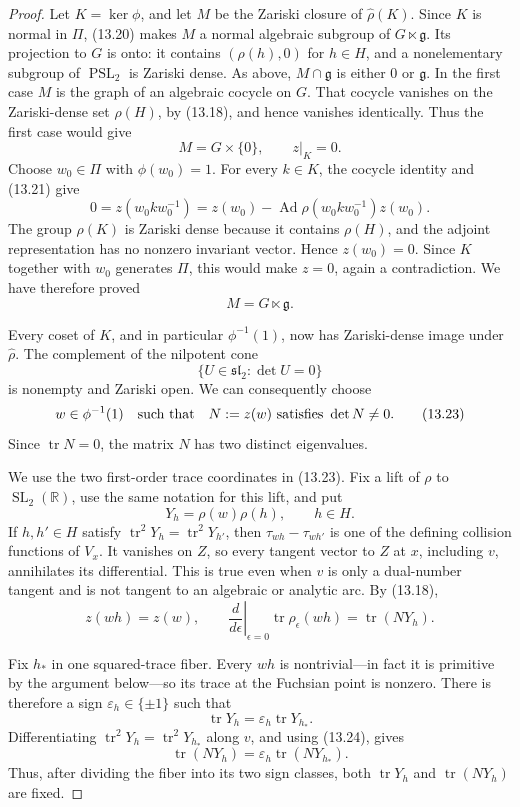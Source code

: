 \documentclass[11pt,reqno]{amsart}
\theoremstyle{definition}
\theoremstyle{remark}
\newcommand{\R}{\mathbb R}
\newcommand{\Tr}{\operatorname{tr}}
\newcommand{\SL}{\operatorname{SL}}
\newcommand{\PSL}{\operatorname{PSL}}
\newcommand{\Ad}{\operatorname{Ad}}
\begin{document}
\begin{proof}
Let \(K=\ker\phi\), and let \(M\) be the Zariski closure of
\(\widehat\rho(K)\).  Since \(K\) is normal in \(\Pi\), (13.20) makes
\(M\) a normal algebraic subgroup of \(G\ltimes\mathfrak g\).  Its
projection to \(G\) is onto: it contains
\((\rho(h),0)\) for \(h\in H\), and a nonelementary subgroup of
\(\PSL_2\) is Zariski dense.  As above,
\(M\cap\mathfrak g\) is either \(0\) or \(\mathfrak g\).  In the first
case \(M\) is the graph of an algebraic cocycle on \(G\).  That cocycle
vanishes on the Zariski-dense set \(\rho(H)\), by (13.18), and hence
vanishes identically.  Thus the first case would give
\[
 M=G\times\{0\},\qquad z|_K=0.
\tag{13.21}
\]
Choose \(w_0\in\Pi\) with \(\phi(w_0)=1\).  For every \(k\in K\), the
cocycle identity and (13.21) give
\[
 0=z(w_0kw_0^{-1})
   =z(w_0)-\Ad\rho(w_0kw_0^{-1})z(w_0).
\]
The group \(\rho(K)\) is Zariski dense because it contains \(\rho(H)\),
and the adjoint representation has no nonzero invariant vector.  Hence
\(z(w_0)=0\).  Since \(K\) together with \(w_0\) generates \(\Pi\), this
would make \(z=0\), again a contradiction.  We have therefore proved
\[
 M=G\ltimes\mathfrak g.
\tag{13.22}
\]

Every coset of \(K\), and in particular \(\phi^{-1}(1)\), now has
Zariski-dense image under \(\widehat\rho\).  The complement of the
nilpotent cone
\[
 \{U\in\mathfrak{sl}_2:\det U=0\}
\]
is nonempty and Zariski open.  We can consequently choose
\[
 w\in\phi^{-1}(1)
 \quad\hbox{such that}\quad
 N:=z(w)\ \hbox{satisfies}\ \det N\ne0.
\tag{13.23}
\]
Since \(\Tr N=0\), the matrix \(N\) has two distinct eigenvalues.

We use the two first-order trace coordinates in (13.23).  Fix a
lift of \(\rho\) to \(\SL_2(\R)\), use the same notation for this lift,
and put
\[
 Y_h=\rho(w)\rho(h),\qquad h\in H.
\]
If \(h,h'\in H\) satisfy
\(\Tr^2Y_h=\Tr^2Y_{h'}\), then
\(\tau_{wh}-\tau_{wh'}\) is one of the defining collision functions of
\(V_x\).  It vanishes on \(Z\), so every tangent vector to \(Z\) at \(x\),
including \(v\), annihilates its differential.  This is true even when
\(v\) is only a dual-number tangent and is not tangent to an algebraic or
analytic arc.  By (13.18),
\[
 z(wh)=z(w),
 \qquad
 \left.\frac{d}{d\epsilon}\right|_{\epsilon=0}
 \Tr\rho_\epsilon(wh)=\Tr(NY_h).
\tag{13.24}
\]

Fix \(h_*\) in one squared-trace fiber.  Every \(wh\) is nontrivial---in
fact it is primitive by the argument below---so its trace at the Fuchsian
point is nonzero.  There is therefore a sign
\(\varepsilon_h\in\{\pm1\}\) such that
\[
 \Tr Y_h=\varepsilon_h\Tr Y_{h_*}.
\]
Differentiating
\(\Tr^2Y_h=\Tr^2Y_{h_*}\) along \(v\), and using (13.24), gives
\[
 \Tr(NY_h)=\varepsilon_h\Tr(NY_{h_*}).
\tag{13.25}
\]
Thus, after dividing the fiber into its two sign classes, both
\(\Tr Y_h\) and \(\Tr(NY_h)\) are fixed.


\end{proof}
\end{document}
